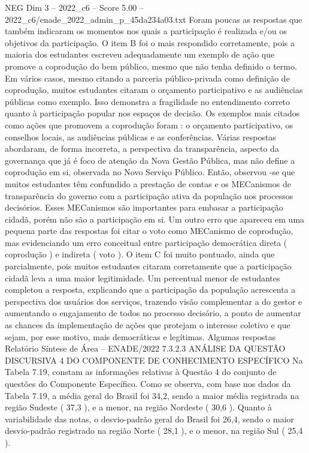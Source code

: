 \begin{textsample}{NEG Dim 3 – 2022\_c6 – Score 5.00 – 2022\_c6/enade\_2022\_admin\_p\_45da234a03.txt}
Foram poucas as respostas que também indicaram os momentos nos quais a participação é realizada e/ou os objetivos da participação.
O item B foi o mais respondido corretamente, pois a maioria dos estudantes escreveu adequadamente um exemplo de ação que promove a coprodução do bem público, mesmo que não tenha definido o termo.
Em vários casos, mesmo citando a parceria público-privada como definição de coprodução, muitos estudantes citaram o orçamento participativo e as audiências públicas como exemplo.
Isso demonstra a fragilidade no entendimento correto quanto à participação popular nos espaços de decisão.
Os exemplos mais citados como ações que promovem a coprodução foram : o orçamento participativo, os conselhos locais, as audiências públicas e as conferências.
Várias respostas abordaram, de forma incorreta, a perspectiva da transparência, aspecto da governança que já é foco de atenção da Nova Gestão Pública, mas não define a coprodução em si, observada no Novo Serviço Público.
Então, observou -se que muitos estudantes têm confundido a prestação de contas e os MECanismos de transparência do governo com a participação ativa da população nos processos decisórios.
Esses MECanismos são importantes para embasar a participação cidadã, porém não são a participação em si.
Um outro erro que apareceu em uma pequena parte das respostas foi citar o voto como MECanismo de coprodução, mas evidenciando um erro conceitual entre participação democrática direta ( coprodução ) e indireta ( voto ).
O item C foi muito pontuado, ainda que parcialmente, pois muitos estudantes citaram corretamente que a participação cidadã leva a uma maior legitimidade.
Um percentual menor de estudantes completou a resposta, explicando que a participação da população acrescenta a perspectiva dos usuários dos serviços, trazendo visão complementar a do gestor e aumentando o engajamento de todos no processo decisório, a ponto de aumentar as chances da implementação de ações que protejam o interesse coletivo e que sejam, por esse motivo, mais democráticas e legítimas.
Algumas respostas Relatório Síntese de Área – ENADE/2022 7.3.2.3 ANÁLISE DA QUESTÃO DISCURSIVA 4 DO COMPONENTE DE CONHECIMENTO ESPECÍFICO Na Tabela 7.19, constam as informações relativas à Questão 4 do conjunto de questões do Componente Específico.
Como se observa, com base nos dados da Tabela 7.19, a média geral do Brasil foi 34,2, sendo a maior média registrada na região Sudeste ( 37,3 ), e a menor, na região Nordeste ( 30,6 ).
Quanto à variabilidade das notas, o desvio-padrão geral do Brasil foi 26,4, sendo o maior desvio-padrão registrado na região Norte ( 28,1 ), e o menor, na região Sul ( 25,4 ).

\end{textsample}
